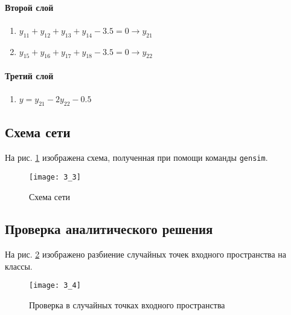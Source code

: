 \paragraph{Второй слой}
\begin{enumerate}
	\item $y_{11} + y_{12} + y_{13} + y_{14} - 3.5 = 0 \rightarrow y_{21}$
	\item $y_{15} + y_{16} + y_{17} + y_{18} - 3.5 = 0 \rightarrow y_{22}$
\end{enumerate}

\paragraph{Третий слой}
\begin{enumerate}
	\item $y = y_{21} - 2 y_{22} - 0.5$
\end{enumerate}

\subsection{Схема сети}


На рис. \ref{fig:3_3} изображена схема, полученная при помощи команды \verb+gensim+.

\begin{figure}[H]
\begin{center}
	\texttt{[image: 3\_3]}
	\caption{Схема сети}
	\label{fig:3_3}
\end{center}
\end{figure}

\subsection{Проверка аналитического решения}


На рис. \ref{fig:3_4} изображено разбиение случайных точек входного пространства на классы.

\begin{figure}[H]
\begin{center}
	\texttt{[image: 3\_4]}
	\caption{Проверка в случайных точках входного пространства}
	\label{fig:3_4}
\end{center}
\end{figure}

